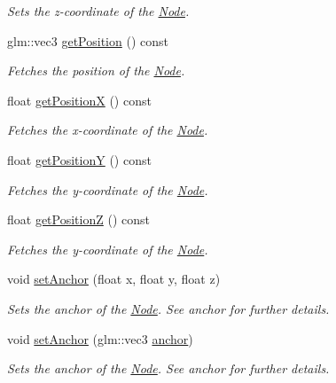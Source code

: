 \begin{DoxyCompactItemize}
\begin{DoxyCompactList}\small\item\em Sets the z-\/coordinate of the \mbox{\hyperlink{classsage_1_1Node}{Node}}. \end{DoxyCompactList}\item 
glm\+::vec3 \mbox{\hyperlink{classsage_1_1Node_a11fbdf2a2dcdf8bdc014df65f3003925}{get\+Position}} () const
\begin{DoxyCompactList}\small\item\em Fetches the position of the \mbox{\hyperlink{classsage_1_1Node}{Node}}. \end{DoxyCompactList}\item 
float \mbox{\hyperlink{classsage_1_1Node_a17e92da5beaeb4b299c4e93729a22b1a}{get\+PositionX}} () const
\begin{DoxyCompactList}\small\item\em Fetches the x-\/coordinate of the \mbox{\hyperlink{classsage_1_1Node}{Node}}. \end{DoxyCompactList}\item 
float \mbox{\hyperlink{classsage_1_1Node_a26337a40b7da400233451b71e85759cc}{get\+PositionY}} () const
\begin{DoxyCompactList}\small\item\em Fetches the y-\/coordinate of the \mbox{\hyperlink{classsage_1_1Node}{Node}}. \end{DoxyCompactList}\item 
float \mbox{\hyperlink{classsage_1_1Node_a0c6023aabdeeff9cf981ad81e6aaed9c}{get\+PositionZ}} () const
\begin{DoxyCompactList}\small\item\em Fetches the y-\/coordinate of the \mbox{\hyperlink{classsage_1_1Node}{Node}}. \end{DoxyCompactList}\item 
void \mbox{\hyperlink{classsage_1_1Node_a04d15cec594320725e6ef44756346d2a}{set\+Anchor}} (float x, float y, float z)
\begin{DoxyCompactList}\small\item\em Sets the anchor of the \mbox{\hyperlink{classsage_1_1Node}{Node}}. See anchor for further details. \end{DoxyCompactList}\item 
void \mbox{\hyperlink{classsage_1_1Node_a96a786cd6d6750d60c8195aa4895de7c}{set\+Anchor}} (glm\+::vec3 \mbox{\hyperlink{classsage_1_1Node_a8698d732514fa2caba0ccee46dbae17a}{anchor}})
\begin{DoxyCompactList}\small\item\em Sets the anchor of the \mbox{\hyperlink{classsage_1_1Node}{Node}}. See anchor for further details. \end{DoxyCompactList}\item 

\end{DoxyCompactItemize}

